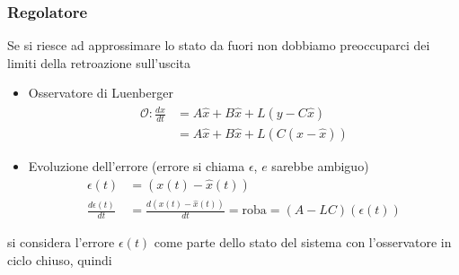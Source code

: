 \documentclass{article}
\begin{document}
\subsubsection{Regolatore}

Se si riesce ad approssimare lo stato da fuori non dobbiamo preoccuparci dei
limiti della retroazione sull'uscita

\begin{itemize}
\item Osservatore di Luenberger
  \begin{align*}
    \mathcal{O} : \frac{d\hat{x}}{dt} &= A\hat{x} + B\hat{x} + L(y-C\hat{x}) \\
    &= A\hat{x} + B\hat{x} + L(C(x-\hat{x}))
  \end{align*}
\item Evoluzione dell'errore (errore si chiama $\epsilon$, $e$ sarebbe ambiguo)
  \begin{align*}
    \epsilon (t) &= (x(t) - \hat{x}(t)) \\
    \frac{d\epsilon (t)}{dt} &= \frac{d(x(t) - \hat{x}(t))}{dt}
    = \text{roba} = (A-LC)(\epsilon (t))
  \end{align*}
\end{itemize}
si considera l'errore $\epsilon (t)$ come parte dello stato del sistema con
l'osservatore in ciclo chiuso, quindi 
\end{document}
